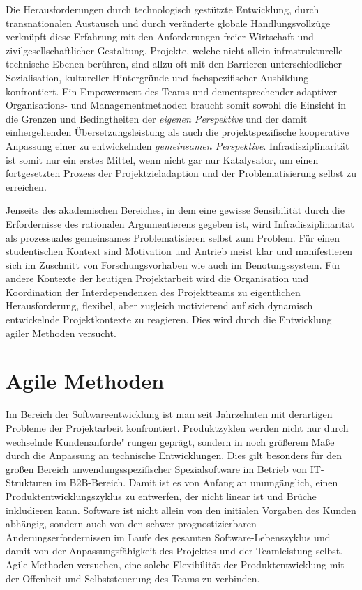 \documentclass[a4paper,11pt]{article}
\begin{document}
Die Herausforderungen durch technologisch gestützte Entwicklung, durch
transnationalen Austausch und durch veränderte globale Handlungsvollzüge
verknüpft diese Erfahrung mit den Anforderungen freier Wirtschaft und
zivilgesellschaftlicher Gestaltung. Projekte, welche nicht allein
infrastrukturelle technische Ebenen berühren, sind allzu oft mit den Barrieren
unterschiedlicher Sozialisation, kultureller Hintergründe und fachspezifischer
Ausbildung konfrontiert. Ein Empowerment des Teams und dementsprechender
adaptiver Organisations- und Managementmethoden braucht somit sowohl die
Einsicht in die Grenzen und Bedingtheiten der \emph{eigenen Perspektive} und
der damit einhergehenden Übersetzungsleistung als auch die projektspezifische
kooperative Anpassung einer zu entwickelnden \emph{gemeinsamen Perspektive}.
Infradisziplinarität ist somit nur ein erstes Mittel, wenn nicht gar nur
Katalysator, um einen fortgesetzten Prozess der Projektzieladaption und der
Problematisierung selbst zu erreichen.

Jenseits des akademischen Bereiches, in dem eine gewisse Sensibilität durch
die Erfordernisse des rationalen Argumentierens gegeben ist, wird
Infradisziplinarität als prozessuales gemeinsames Problematisieren selbst zum
Problem. Für einen studentischen Kontext sind Motivation und Antrieb meist
klar und manifestieren sich im Zuschnitt von Forschungsvorhaben wie auch im
Benotungssystem. Für andere Kontexte der heutigen Projektarbeit wird die
Organisation und Koordination der Interdependenzen des Projektteams zu
eigentlichen Herausforderung, flexibel, aber zugleich motivierend auf sich
dynamisch entwickelnde Projektkontexte zu reagieren. Dies wird durch die
Entwicklung agiler Methoden versucht.

\section*{Agile Methoden}

Im Bereich der Softwareentwicklung ist man seit Jahrzehnten mit derartigen
Probleme der Projektarbeit konfrontiert. Produktzyklen werden nicht nur durch
wechselnde Kundenanforde"|rungen geprägt, sondern in noch größerem Maße durch
die Anpassung an technische Entwicklungen. Dies gilt besonders für den großen
Bereich anwendungsspezifischer Spezialsoftware im Betrieb von IT-Strukturen im
B2B-Bereich.  Damit ist es von Anfang an unumgänglich, einen
Produktentwicklungszyklus zu entwerfen, der nicht linear ist und Brüche
inkludieren kann. Software ist nicht allein von den initialen Vorgaben des
Kunden abhängig, sondern auch von den schwer prognostizierbaren
Änderungserfordernissen im Laufe des gesamten Software-Lebenszyklus und damit
von der Anpassungsfähigkeit des Projektes und der Teamleistung selbst. Agile
Methoden versuchen, eine solche Flexibilität der Produktentwicklung mit der
Offenheit und Selbststeuerung des Teams zu verbinden.
\end{document}
